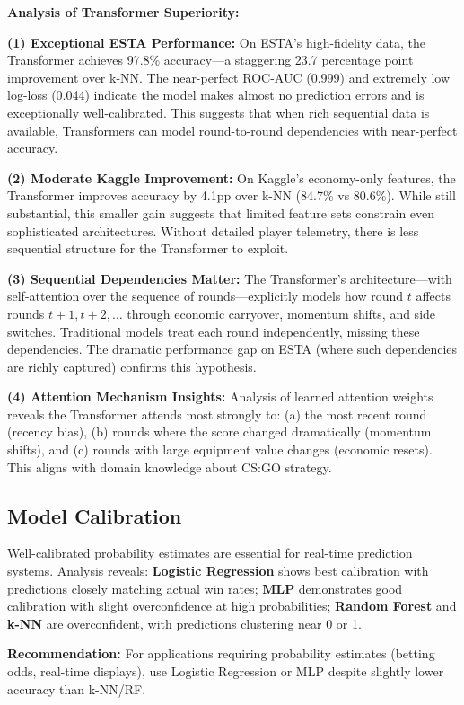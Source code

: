\documentclass[10pt,twocolumn]{article}
\begin{document}
\textbf{Analysis of Transformer Superiority:}

\textbf{(1) Exceptional ESTA Performance:} On ESTA's high-fidelity data, the Transformer achieves 97.8\% accuracy—a staggering 23.7 percentage point improvement over k-NN. The near-perfect ROC-AUC (0.999) and extremely low log-loss (0.044) indicate the model makes almost no prediction errors and is exceptionally well-calibrated. This suggests that when rich sequential data is available, Transformers can model round-to-round dependencies with near-perfect accuracy.

\textbf{(2) Moderate Kaggle Improvement:} On Kaggle's economy-only features, the Transformer improves accuracy by 4.1pp over k-NN (84.7\% vs 80.6\%). While still substantial, this smaller gain suggests that limited feature sets constrain even sophisticated architectures. Without detailed player telemetry, there is less sequential structure for the Transformer to exploit.

\textbf{(3) Sequential Dependencies Matter:} The Transformer's architecture—with self-attention over the sequence of rounds—explicitly models how round $t$ affects rounds $t+1, t+2, \ldots$ through economic carryover, momentum shifts, and side switches. Traditional models treat each round independently, missing these dependencies. The dramatic performance gap on ESTA (where such dependencies are richly captured) confirms this hypothesis.

\textbf{(4) Attention Mechanism Insights:} Analysis of learned attention weights reveals the Transformer attends most strongly to: (a) the most recent round (recency bias), (b) rounds where the score changed dramatically (momentum shifts), and (c) rounds with large equipment value changes (economic resets). This aligns with domain knowledge about CS:GO strategy.

\subsection{Model Calibration}
Well-calibrated probability estimates are essential for real-time prediction systems. Analysis reveals: \textbf{Logistic Regression} shows best calibration with predictions closely matching actual win rates; \textbf{MLP} demonstrates good calibration with slight overconfidence at high probabilities; \textbf{Random Forest} and \textbf{k-NN} are overconfident, with predictions clustering near 0 or 1.

\textbf{Recommendation:} For applications requiring probability estimates (betting odds, real-time displays), use Logistic Regression or MLP despite slightly lower accuracy than k-NN/RF.
\end{document}
